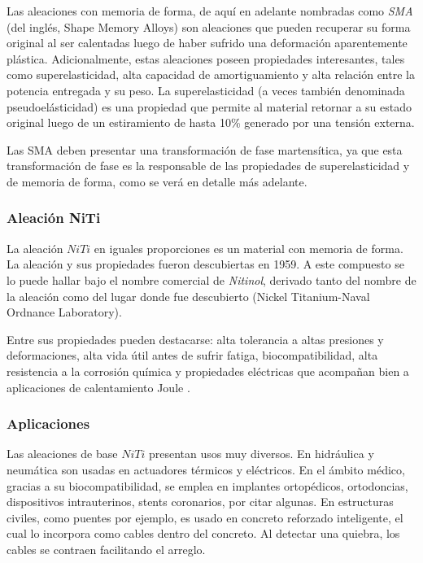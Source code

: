 \documentclass[12pt]{article}
\theoremstyle{definition}
\theoremstyle{remark}
\begin{document}
Las aleaciones con memoria de forma, de aquí en adelante nombradas como \textit{SMA} (del inglés, Shape Memory Alloys) son aleaciones que pueden recuperar su forma original al ser calentadas luego de haber sufrido una deformación aparentemente plástica. Adicionalmente, estas aleaciones poseen propiedades interesantes, tales como superelasticidad, alta capacidad de amortiguamiento y alta relación entre la potencia entregada y su peso. La superelasticidad (a veces también denominada pseudoelásticidad) es una propiedad que permite al material retornar a su estado original luego de un estiramiento de hasta 10\% generado por una tensión externa\cite{Rubber}.

Las SMA deben presentar una transformación de fase martensítica, ya que esta transformación de fase es la responsable de las propiedades de superelasticidad y de memoria de forma, como se verá en detalle más adelante.

\subsubsection{Aleación NiTi}\label{aleation}
La aleación $NiTi$ en iguales proporciones es un material con memoria de forma. La aleación y sus propiedades fueron descubiertas en 1959. A este compuesto se lo puede hallar bajo el nombre comercial de \textit{Nitinol}, derivado tanto del nombre de la aleación como del lugar donde fue descubierto (Nickel Titanium-Naval Ordnance Laboratory)\cite{Story}. 

Entre sus propiedades pueden destacarse: alta tolerancia a altas presiones y deformaciones, alta vida útil antes de sufrir fatiga, biocompatibilidad, alta resistencia a la corrosión química y propiedades eléctricas que acompañan bien a aplicaciones de calentamiento Joule \cite{ThinFilm}.

\subsubsection{Aplicaciones}
Las aleaciones de base $NiTi$ presentan usos muy diversos. En hidráulica y neumática son usadas en actuadores térmicos y eléctricos. En el ámbito médico, gracias a su biocompatibilidad, se emplea en implantes ortopédicos, ortodoncias, dispositivos intrauterinos, stents coronarios, por citar algunas. En estructuras civiles, como puentes por ejemplo, es usado en concreto reforzado inteligente, el cual lo incorpora como cables dentro del concreto. Al detectar una quiebra, los cables se contraen facilitando el arreglo\cite{Engineering}.
\end{document}
